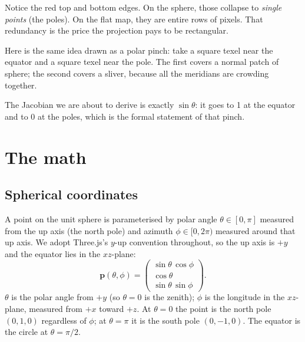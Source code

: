 \documentclass{article}
\begin{document}
Notice the red top and bottom edges. On the sphere, those collapse to
\emph{single points} (the poles). On the flat map, they are entire rows of
pixels. That redundancy is the price the projection pays to be rectangular.

Here is the same idea drawn as a polar pinch: take a square texel near the
equator and a square texel near the pole. The first covers a normal patch of
sphere; the second covers a sliver, because all the meridians are
crowding together.

\begin{center}
\end{center}

The Jacobian we are about to derive is exactly $\sin\theta$: it goes to 1 at
the equator and to 0 at the poles, which is the formal statement of that
pinch.

\section{The math}

\subsection{Spherical coordinates}

A point on the unit sphere is parameterised by polar angle
$\theta \in [0, \pi]$ measured from the up axis (the north pole) and azimuth
$\phi \in [0, 2\pi)$ measured around that up axis. We adopt Three.js's
$y$-up convention throughout, so the up axis is $+y$ and the equator lies in
the $xz$-plane:
\begin{equation}
  \mathbf{p}(\theta, \phi) = \begin{pmatrix} \sin\theta\,\cos\phi \\ \cos\theta \\ \sin\theta\,\sin\phi \end{pmatrix}.
\end{equation}
$\theta$ is the polar angle from $+y$ (so $\theta=0$ is the zenith);
$\phi$ is the longitude in the $xz$-plane, measured from $+x$ toward $+z$.
At $\theta = 0$ the point is the north pole $(0, 1, 0)$ regardless of $\phi$;
at $\theta = \pi$ it is the south pole $(0, -1, 0)$. The equator is the
circle at $\theta = \pi/2$.
\end{document}
